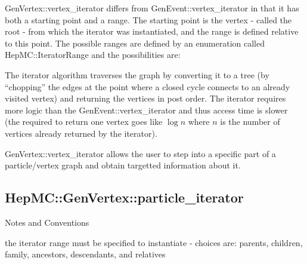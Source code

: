 \documentclass[11pt,letterpaper]{article}
\begin{document}
GenVertex::vertex\_iterator differs from GenEvent::vertex\_iterator
in that it has both a starting point and a range. The starting point
is the vertex - called the root - from which the iterator was
instantiated, and the range is defined relative to this point.
The possible ranges are defined by an enumeration called
HepMC::IteratorRange and the possibilities are:
\begin{itemize}\setlength{\itemsep}{0pt}
\end{itemize}

The iterator algorithm traverses the graph by converting it to a tree
(by ``chopping'' the edges at the point where a closed cycle connects
to an already visited vertex) and returning the vertices in post
order. The iterator requires more logic than the
GenEvent::vertex\_iterator and thus access time is slower (the
required to return one vertex goes like $\log n$ where $n$ is the
number of vertices already returned by the iterator).

GenVertex::vertex\_iterator allows the user to step into a specific part
of a particle/vertex graph and obtain targetted information about it. 

%
%

\subsection{HepMC::GenVertex::particle\_iterator}
\begin{myitemize}{Notes and Conventions}
  \item the iterator range must be specified to instantiate -
    choices are: parents, children, family, ancestors, descendants,
    and relatives 
\end{myitemize}
\end{document}
